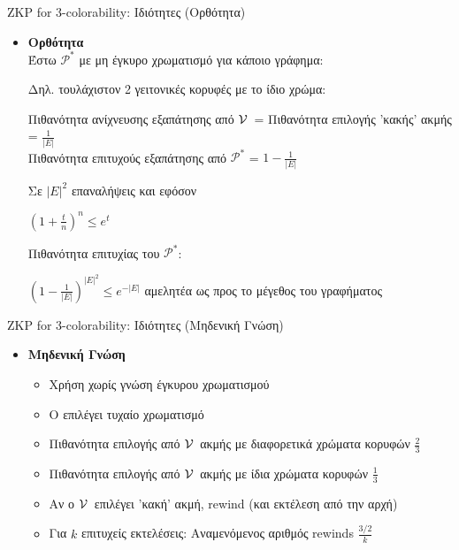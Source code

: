 \documentclass[10pt,handout]{beamer}
\begin{document}
\begin{frame}{ZKP for 3-colorability: Ιδιότητες (Ορθότητα)} 
\begin{itemize}
\item \textbf{Ορθότητα}\\
Έστω $\mathcal{P}^*$ με μη έγκυρο χρωματισμό για κάποιο γράφημα:

Δηλ. \alert{τουλάχιστον 2 γειτονικές κορυφές με το ίδιο χρώμα}:
\pause

Πιθανότητα ανίχνευσης εξαπάτησης από $\mathcal{V}\,$ = Πιθανότητα επιλογής 'κακής' ακμής = $\frac{1}{|E|}$  \\

Πιθανότητα επιτυχούς εξαπάτησης από $\mathcal{P}^*$ = $1-\frac{1}{|E|}$
\pause

Σε $|E|^2$ επαναλήψεις \pause και εφόσον
\begin{center}
$(1+\frac{t}{n})^n \leq e^t$
\end{center}
\pause
\medskip
Πιθανότητα επιτυχίας του  $\mathcal{P}^*$:

\begin{center}
$(1-\frac{1}{|E|})^{|E|^2} \leq e^{-|E|}$ \pause \alert{αμελητέα} ως προς το μέγεθος του γραφήματος
\end{center}

\end{itemize}
\end{frame}

\begin{frame}{ZKP for 3-colorability: Ιδιότητες (Μηδενική Γνώση)} 
\begin{itemize}
\item \textbf{Μηδενική Γνώση} 
\begin{itemize}
\item Χρήση \siml χωρίς γνώση έγκυρου χρωματισμού \pause
\item Ο \siml  επιλέγει τυχαίο χρωματισμό \pause
\item Πιθανότητα επιλογής από $\mathcal{V}\,$  ακμής με διαφορετικά χρώματα κορυφών $\frac{2}{3}$ \pause
\item Πιθανότητα επιλογής από $\mathcal{V}\,$  ακμής με ίδια χρώματα κορυφών  $\frac{1}{3}$ \pause
\item Αν ο $\mathcal{V}\,$  επιλέγει 'κακή' ακμή, rewind (και εκτέλεση από την αρχή) \pause

\item Για $k$ επιτυχείς εκτελέσεις: Αναμενόμενος αριθμός rewinds $\frac{3/2}k$

\end{itemize}
\end{itemize}
\end{frame}
\end{document}
